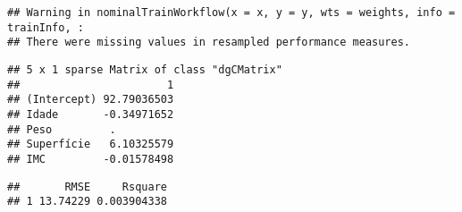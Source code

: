 \documentclass[]{article}
\newenvironment{Shaded}{\begin{snugshade}}{\end{snugshade}}
\newcommand{\CommentTok}[1]{\textcolor[rgb]{0.56,0.35,0.01}{\textit{#1}}}
\newcommand{\DataTypeTok}[1]{\textcolor[rgb]{0.13,0.29,0.53}{#1}}
\newcommand{\DecValTok}[1]{\textcolor[rgb]{0.00,0.00,0.81}{#1}}
\newcommand{\KeywordTok}[1]{\textcolor[rgb]{0.13,0.29,0.53}{\textbf{#1}}}
\newcommand{\NormalTok}[1]{#1}
\newcommand{\OperatorTok}[1]{\textcolor[rgb]{0.81,0.36,0.00}{\textbf{#1}}}
\newcommand{\StringTok}[1]{\textcolor[rgb]{0.31,0.60,0.02}{#1}}
\begin{document}
\begin{verbatim}
## Warning in nominalTrainWorkflow(x = x, y = y, wts = weights, info = trainInfo, :
## There were missing values in resampled performance measures.
\end{verbatim}

\begin{Shaded}
\end{Shaded}

\begin{verbatim}
## 5 x 1 sparse Matrix of class "dgCMatrix"
##                       1
## (Intercept) 92.79036503
## Idade       -0.34971652
## Peso         .         
## Superfície   6.10325579
## IMC         -0.01578498
\end{verbatim}

\begin{Shaded}
\end{Shaded}

\begin{verbatim}
##       RMSE     Rsquare
## 1 13.74229 0.003904338
\end{verbatim}

\begin{Shaded}
\end{Shaded}
\end{document}
